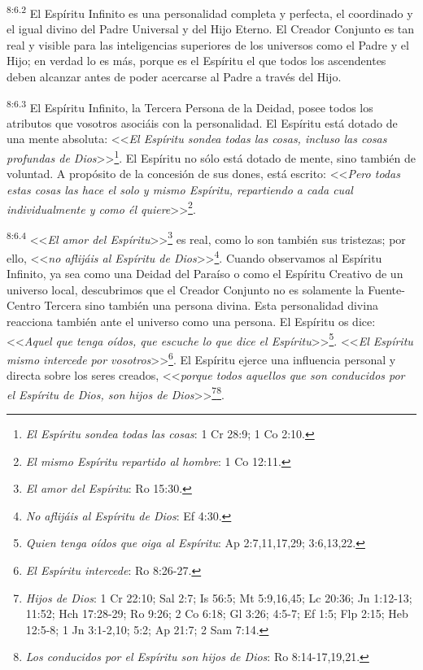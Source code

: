 \par
\textsuperscript{8:6.2} El Espíritu Infinito es una personalidad completa y perfecta, el coordinado y el igual divino del Padre Universal y del Hijo Eterno. El Creador Conjunto es tan real y visible para las inteligencias superiores de los universos como el Padre y el Hijo; en verdad lo es más, porque es el Espíritu el que todos los ascendentes deben alcanzar antes de poder acercarse al Padre a través del Hijo.

\par
\textsuperscript{8:6.3} El Espíritu Infinito, la Tercera Persona de la Deidad, posee todos los atributos que vosotros asociáis con la personalidad. El Espíritu está dotado de una mente absoluta: <<\textit{El Espíritu sondea todas las cosas, incluso las cosas profundas de Dios}>>\footnote{\textit{El Espíritu sondea todas las cosas}: 1 Cr 28:9; 1 Co 2:10.}. El Espíritu no sólo está dotado de mente, sino también de voluntad. A propósito de la concesión de sus dones, está escrito: <<\textit{Pero todas estas cosas las hace el solo y mismo Espíritu, repartiendo a cada cual individualmente y como él quiere}>>\footnote{\textit{El mismo Espíritu repartido al hombre}: 1 Co 12:11.}.

\par
\textsuperscript{8:6.4} <<\textit{El amor del Espíritu}>>\footnote{\textit{El amor del Espíritu}: Ro 15:30.} es real, como lo son también sus tristezas; por ello, <<\textit{no aflijáis al Espíritu de Dios}>>\footnote{\textit{No aflijáis al Espíritu de Dios}: Ef 4:30.}. Cuando observamos al Espíritu Infinito, ya sea como una Deidad del Paraíso o como el Espíritu Creativo de un universo local, descubrimos que el Creador Conjunto no es solamente la Fuente-Centro Tercera sino también una persona divina. Esta personalidad divina reacciona también ante el universo como una persona. El Espíritu os dice: <<\textit{Aquel que tenga oídos, que escuche lo que dice el Espíritu}>>\footnote{\textit{Quien tenga oídos que oiga al Espíritu}: Ap 2:7,11,17,29; 3:6,13,22.}. <<\textit{El Espíritu mismo intercede por vosotros}>>\footnote{\textit{El Espíritu intercede}: Ro 8:26-27.}. El Espíritu ejerce una influencia personal y directa sobre los seres creados, <<\textit{porque todos aquellos que son conducidos por el Espíritu de Dios, son hijos de Dios}>>\footnote{\textit{Hijos de Dios}: 1 Cr 22:10; Sal 2:7; Is 56:5; Mt 5:9,16,45; Lc 20:36; Jn 1:12-13; 11:52; Hch 17:28-29; Ro 9:26; 2 Co 6:18; Gl 3:26; 4:5-7; Ef 1:5; Flp 2:15; Heb 12:5-8; 1 Jn 3:1-2,10; 5:2; Ap 21:7; 2 Sam 7:14.}\footnote{\textit{Los conducidos por el Espíritu son hijos de Dios}: Ro 8:14-17,19,21.}.

